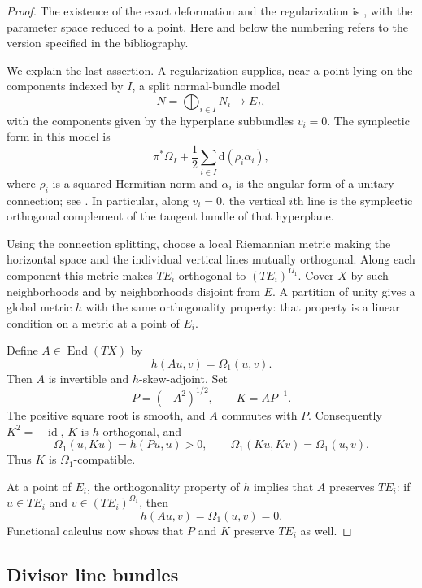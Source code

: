 \documentclass[11pt]{article}
\theoremstyle{definition}
\theoremstyle{remark}
\newcommand{\dd}{\mathrm d}
\newcommand{\id}{\operatorname{id}}
\newcommand{\End}{\operatorname{End}}
\begin{document}
\begin{proof}
The existence of the exact deformation and the regularization is
\cite[Theorem~2.13]{TMZ}, with the parameter space reduced to a point.
Here and below the numbering refers to the version specified in the
bibliography.

We explain the last assertion.  A regularization supplies, near a
point lying on the components indexed by $I$, a split normal-bundle
model
\[
N=\bigoplus_{i\in I}N_i\longrightarrow E_I,
\]
with the components given by the hyperplane subbundles $v_i=0$.
The symplectic form in this model is
\[
\pi^*\Omega_I+\frac12\sum_{i\in I}\dd(\rho_i\alpha_i),
\]
where $\rho_i$ is a squared Hermitian norm and $\alpha_i$ is the
angular form of a unitary connection; see \cite[Section~2.2]{TMZ}.
In particular, along $v_i=0$, the vertical $i$th line is the
symplectic orthogonal complement of the tangent bundle of that
hyperplane.

Using the connection splitting, choose a local Riemannian metric
making the horizontal space and the individual vertical lines
mutually orthogonal.  Along each component this metric makes
$TE_i$ orthogonal to $(TE_i)^{\Omega_1}$.  Cover $X$ by such
neighborhoods and by neighborhoods disjoint from $E$.  A partition
of unity gives a global metric $h$ with the same orthogonality
property: that property is a linear condition on a metric at a
point of $E_i$.

Define $A\in\End(TX)$ by
\[
h(Au,v)=\Omega_1(u,v).
\]
Then $A$ is invertible and $h$-skew-adjoint.  Set
\[
P=(-A^2)^{1/2},\qquad K=AP^{-1}.
\]
The positive square root is smooth, and $A$ commutes with $P$.
Consequently $K^2=-\id$, $K$ is $h$-orthogonal, and
\[
\Omega_1(u,Ku)=h(Pu,u)>0,\qquad
\Omega_1(Ku,Kv)=\Omega_1(u,v).
\]
Thus $K$ is $\Omega_1$-compatible.

At a point of $E_i$, the orthogonality property of $h$ implies that
$A$ preserves $TE_i$: if $u\in TE_i$ and
$v\in(TE_i)^{\Omega_1}$, then
\[
h(Au,v)=\Omega_1(u,v)=0.
\]
Functional calculus now shows that $P$ and $K$ preserve $TE_i$
as well.
\end{proof}



\subsection{Divisor line bundles}
\end{document}
